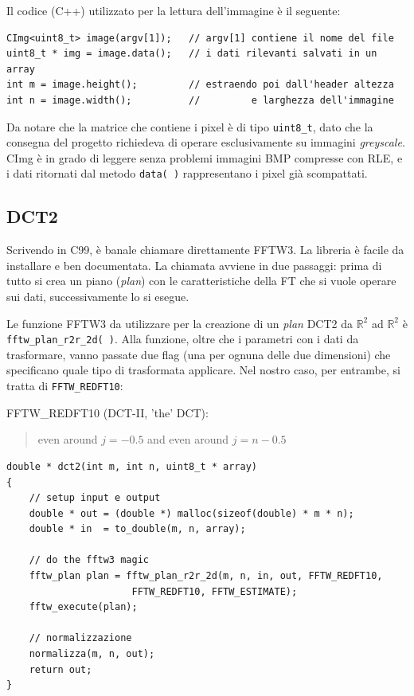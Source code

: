 \documentclass[11pt,a4paper]{scrartcl}
\begin{document}
Il codice (C++) utilizzato per la lettura dell'immagine è il seguente:

\begin{verbatim}
CImg<uint8_t> image(argv[1]);   // argv[1] contiene il nome del file
uint8_t * img = image.data();   // i dati rilevanti salvati in un array
int m = image.height();         // estraendo poi dall'header altezza
int n = image.width();          //         e larghezza dell'immagine
\end{verbatim}

Da notare che la matrice che contiene i pixel è di tipo \texttt{uint8\_t}, dato che la consegna del progetto richiedeva di operare esclusivamente su immagini \emph{greyscale}. CImg è in grado di leggere senza problemi immagini BMP compresse con RLE, e i dati ritornati dal metodo \texttt{data( )} rappresentano i pixel già scompattati.

\subsection*{DCT2}

Scrivendo in C99, è banale chiamare direttamente FFTW3. La libreria è facile da installare e ben documentata. La chiamata avviene in due passaggi: prima di tutto si crea un piano (\emph{plan}) con le caratteristiche della FT che si vuole operare sui dati, successivamente lo si esegue.

Le funzione FFTW3 da utilizzare per la creazione di un \emph{plan} DCT2 da $\mathbb{R}^2$ ad $\mathbb{R}^2$ è \texttt{fftw\_plan\_r2r\_2d( )}. Alla funzione, oltre che i parametri con i dati da trasformare, vanno passate due flag (una per ognuna delle due dimensioni) che specificano quale tipo di trasformata applicare. Nel nostro caso, per entrambe, si tratta di \texttt{FFTW\_REDFT10}:

FFTW\_REDFT10 (DCT-II, 'the' DCT):
\begin{quotation}
even around $j=-0.5$ and even around $j=n-0.5$
\end{quotation}

\begin{verbatim}
double * dct2(int m, int n, uint8_t * array)
{
    // setup input e output
    double * out = (double *) malloc(sizeof(double) * m * n);
    double * in  = to_double(m, n, array);

    // do the fftw3 magic
    fftw_plan plan = fftw_plan_r2r_2d(m, n, in, out, FFTW_REDFT10,
				      FFTW_REDFT10, FFTW_ESTIMATE);
    fftw_execute(plan);

    // normalizzazione
    normalizza(m, n, out);
    return out;
}
\end{verbatim}
\end{document}
